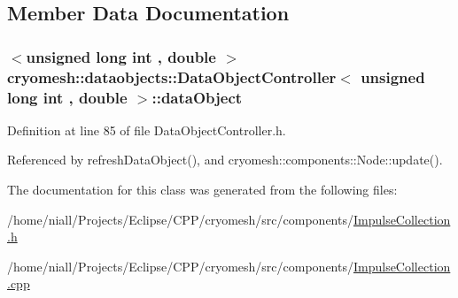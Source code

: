 \subsection{\-Member \-Data \-Documentation}
\hypertarget{classcryomesh_1_1dataobjects_1_1DataObjectController_aa13d30e9fa2f1caa0510635214d4bb26}{
\subsubsection[{data\-Object}]{$<$unsigned long int , double $>$ {\bf cryomesh\-::dataobjects\-::\-Data\-Object\-Controller}$<$ unsigned long int , double  $>$\-::{\bf data\-Object}}}\label{classcryomesh_1_1dataobjects_1_1DataObjectController_aa13d30e9fa2f1caa0510635214d4bb26}


\-Definition at line 85 of file \-Data\-Object\-Controller.\-h.



\-Referenced by refresh\-Data\-Object(), and cryomesh\-::components\-::\-Node\-::update().



\-The documentation for this class was generated from the following files\-:\begin{DoxyCompactItemize}
\item 
/home/niall/\-Projects/\-Eclipse/\-C\-P\-P/cryomesh/src/components/\hyperlink{ImpulseCollection_8h}{\-Impulse\-Collection.\-h}\item 
/home/niall/\-Projects/\-Eclipse/\-C\-P\-P/cryomesh/src/components/\hyperlink{ImpulseCollection_8cpp}{\-Impulse\-Collection.\-cpp}\end{DoxyCompactItemize}
